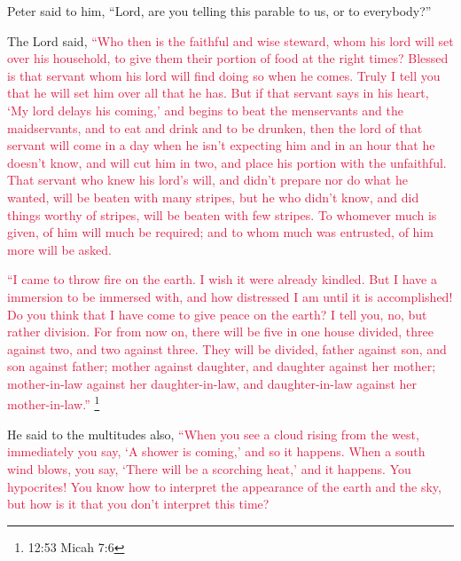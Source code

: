 \myverse{}Peter said to him, “Lord, are you telling this parable to us,
or to everybody?”

\myverse{}The Lord said,
\textcolor{crimson}{“Who then is the faithful and wise steward, whom his lord will set over his household, to give them
	their portion of food at the right times?
}
\myverse{}\textcolor{crimson}{Blessed is that servant whom his lord will find doing so when he comes.
}
\myverse{}\textcolor{crimson}{Truly I tell you that he will set him over all that he has.
}
\myverse{}\textcolor{crimson}{But if that servant says in his heart, ‘My lord delays his coming,’ and
	begins to beat the menservants and the maidservants, and to eat and drink and to be drunken,
}
\myverse{}\textcolor{crimson}{then the lord of that servant will come in a day when he isn’t expecting
	him and in an hour that he doesn’t know, and will cut him in two, and place his portion with the unfaithful.
}
\myverse{}\textcolor{crimson}{That servant who knew his lord’s will, and didn’t prepare nor do what
	he wanted, will be beaten with many stripes,
}
\myverse{}\textcolor{crimson}{but he who didn’t know, and did things worthy of stripes, will be beaten
	with few stripes. To whomever much is given, of him will much be required; and to whom much was entrusted,
	of him more will be asked.
}

\myverse{}\textcolor{crimson}{“I came to throw fire on the earth. I wish it were already
	kindled.
}
\myverse{}\textcolor{crimson}{But I have a immersion to be immersed with, and how distressed I am until
	it is accomplished!
}
\myverse{}\textcolor{crimson}{Do you think that I have come to give peace on the earth? I tell you,
	no, but rather division.
}
\myverse{}\textcolor{crimson}{For from now on, there will be five in one house divided, three against
	two, and two against three.
}
\myverse{}\textcolor{crimson}{They will be divided, father against son, and son against father; mother
	against daughter, and daughter against her mother; mother-in-law against her daughter-in-law, and daughter-in-law
	against her mother-in-law.”
}\footnote{ 12:53 Micah 7:6}

\myverse{}He said to the multitudes also,
\textcolor{crimson}{“When you see a cloud rising from the west, immediately you say, ‘A shower is coming,’ and so it happens.
}
\myverse{}\textcolor{crimson}{When a south wind blows, you say, ‘There will be a scorching heat,’ and
	it happens.
}
\myverse{}\textcolor{crimson}{You hypocrites! You know how to interpret the appearance of the earth
	and the sky, but how is it that you don’t interpret this time?
}

